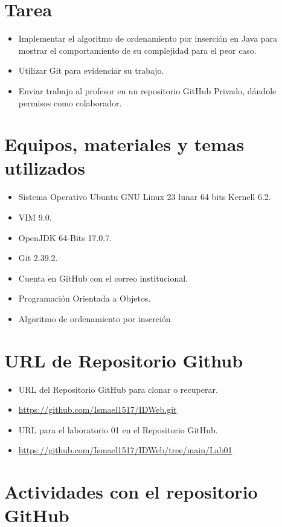 \documentclass{article}
\begin{document}
	\section{Tarea}
	\begin{itemize}		
		\item Implementar el algoritmo de ordenamiento por inserción en Java para mostrar el comportamiento de su complejidad para el peor caso.
		\item Utilizar Git para evidenciar su trabajo.
		\item Enviar trabajo al profesor en un repositorio GitHub Privado, dándole permisos como colaborador.
	\end{itemize}
		
	\section{Equipos, materiales y temas utilizados}
	\begin{itemize}
		\item Sistema Operativo Ubuntu GNU Linux 23 lunar 64 bits Kernell 6.2.
		\item VIM 9.0.
		\item OpenJDK 64-Bits 17.0.7.
		\item Git 2.39.2.
		\item Cuenta en GitHub con el correo institucional.
		\item Programación Orientada a Objetos.
		\item Algoritmo de ordenamiento por inserción	
	\end{itemize}
	
	\section{URL de Repositorio Github}
	\begin{itemize}
		\item URL del Repositorio GitHub para clonar o recuperar.
		\item \url{https://github.com/Ismael1517/IDWeb.git}
		\item URL para el laboratorio 01 en el Repositorio GitHub.
		\item \url{https://github.com/Ismael1517/IDWeb/tree/main/Lab01}
	\end{itemize}
	
	\section{Actividades con el repositorio GitHub}
	
\end{document}
